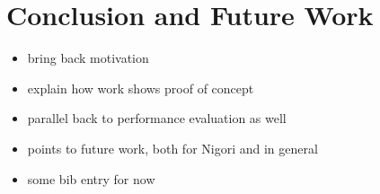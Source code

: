 \chapter{Conclusion and Future Work}

\begin{itemize}
  \item bring back motivation
  \item explain how work shows proof of concept
  \item parallel back to performance evaluation as well
  \item points to future work, both for Nigori and in general
  \item some bib entry for now \cite{readme}
\end{itemize}
